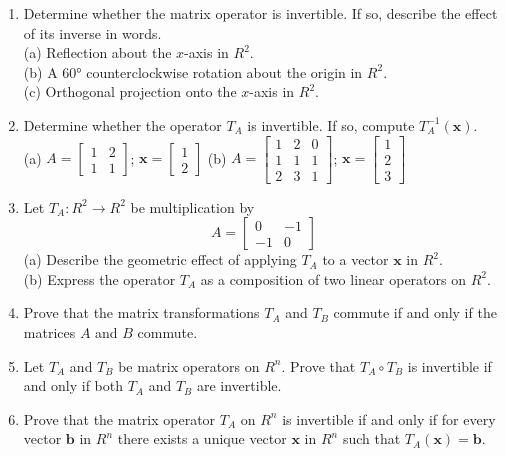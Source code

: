 \documentclass{article}
\theoremstyle{mystyle}
\begin{document}
\begin{enumerate}
\item[21.] Determine whether the matrix operator is invertible. If so, describe the effect of its inverse in words.\\
(a) Reflection about the $x$-axis in $R^2$.\\
(b) A $60°$ counterclockwise rotation about the origin in $R^2$.\\
(c) Orthogonal projection onto the $x$-axis in $R^2$.

\item[23.] Determine whether the operator $T_A$ is invertible. If so, compute $T_A^{-1}(\mathbf{x})$.\\
(a) $A=\begin{bmatrix}1&2\\1&1\end{bmatrix}$;\; $\mathbf{x}=\begin{bmatrix}1\\2\end{bmatrix}$\qquad
(b) $A=\begin{bmatrix}1&2&0\\1&1&1\\2&3&1\end{bmatrix}$;\; $\mathbf{x}=\begin{bmatrix}1\\2\\3\end{bmatrix}$

\item[25.] Let $T_A:R^2\to R^2$ be multiplication by
\[
A=\begin{bmatrix}0&-1\\-1&0\end{bmatrix}
\]
(a) Describe the geometric effect of applying $T_A$ to a vector $\mathbf{x}$ in $R^2$.\\
(b) Express the operator $T_A$ as a composition of two linear operators on $R^2$.

\item[27.] Prove that the matrix transformations $T_A$ and $T_B$ commute if and only if the matrices $A$ and $B$ commute.

\item[28.] Let $T_A$ and $T_B$ be matrix operators on $R^n$. Prove that $T_A\circ T_B$ is invertible if and only if both $T_A$ and $T_B$ are invertible.

\item[29.] Prove that the matrix operator $T_A$ on $R^n$ is invertible if and only if for every vector $\mathbf{b}$ in $R^n$ there exists a unique vector $\mathbf{x}$ in $R^n$ such that $T_A(\mathbf{x})=\mathbf{b}$.
\end{enumerate}
\end{document}
